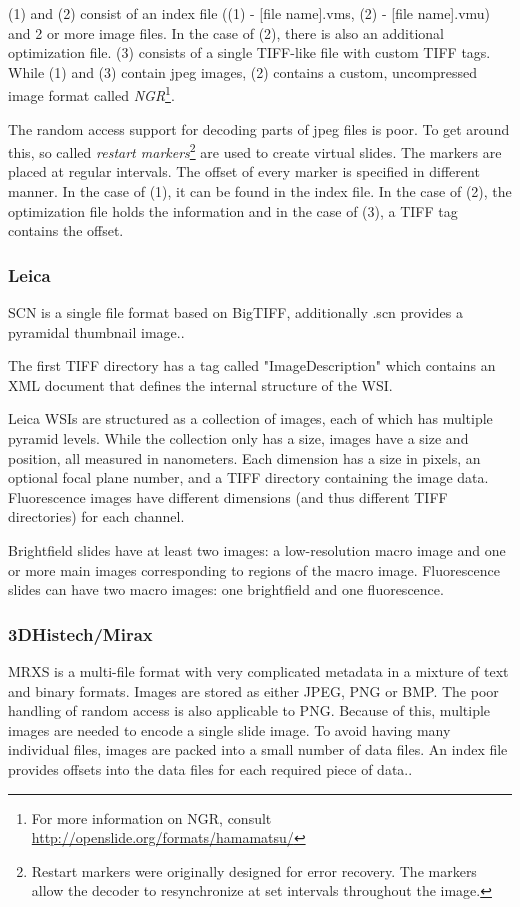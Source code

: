 (1) and (2) consist of an index file ((1) - [file name].vms, (2) - [file name].vmu) and 2 or more image files. In the case of (2), there is also an additional optimization file. (3) consists of a single TIFF-like file with custom TIFF tags. While (1) and (3) contain jpeg images, (2) contains a custom, uncompressed image format called \emph{NGR}\footnote{For more information on NGR, consult \url{http://openslide.org/formats/hamamatsu/}}\cite{web:openslide}.

The random access support for decoding parts of jpeg files is poor. To get around this, so called \emph{restart markers}\footnote{Restart markers were originally designed for error recovery. The markers allow the decoder to resynchronize at set intervals throughout the image\cite{Goode13}.} are used to create virtual slides\cite{Goode13}. The markers are placed at regular intervals. The offset of every marker is specified in different manner. In the case of (1), it can be found in the index file. In the case of (2), the optimization file holds the information and in the case of (3), a TIFF tag contains the offset\cite{web:openslide}.


\subsubsection{Leica}
SCN is a single file format based on BigTIFF, additionally .scn provides a pyramidal thumbnail image.\cite{Goode13}.

The first TIFF directory has a tag called "ImageDescription" which contains an XML document that defines the internal structure of the WSI\cite{web:openslide}.

Leica WSIs are structured as a collection of images, each of which has multiple pyramid levels. While the collection only has a size, images have a size and position, all measured in nanometers. Each dimension has a size in pixels, an optional focal plane number, and a TIFF directory containing the image data. Fluorescence images have different dimensions (and thus different TIFF directories) for each channel\cite{web:openslide}.

Brightfield slides have at least two images: a low-resolution macro image and one or more main images corresponding to regions of the macro image. Fluorescence slides can have two macro images: one brightfield and one fluorescence\cite{web:openslide}.


\subsubsection{3DHistech/Mirax}
MRXS is a multi-file format with very complicated metadata in a mixture of text and binary formats. Images are stored as either JPEG, PNG or BMP\cite{Goode13}. The poor handling of random access is also applicable to PNG. Because of this, multiple images are needed to encode a single slide image. To avoid having many individual files, images are packed into a small number of data files. An index file provides offsets into the data files for each required piece of data.\cite{web:openslide}. 

